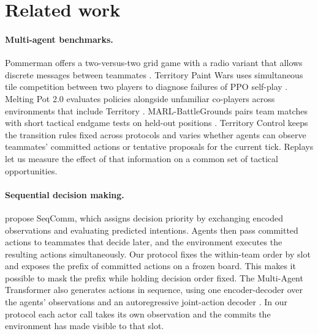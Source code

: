 \section{Related work}
\label{sec:related}

\paragraph{Multi-agent benchmarks.}
Pommerman offers a two-versus-two grid game with a radio variant that allows discrete messages between teammates \citep{resnick2018pommerman}. Territory Paint Wars uses simultaneous tile competition between two players to diagnose failures of PPO self-play \citep{singh2026paintwars}. Melting Pot 2.0 evaluates policies alongside unfamiliar co-players across environments that include Territory \citep{agapiou2022meltingpot}. MARL-BattleGrounds pairs team matches with short tactical endgame tests on held-out positions \citep{hawili2026battlegrounds}. Territory Control keeps the transition rules fixed across protocols and varies whether agents can observe teammates' committed actions or tentative proposals for the current tick. Replays let us measure the effect of that information on a common set of tactical opportunities.

\paragraph{Sequential decision making.}
\citet{ding2024seqcomm} propose SeqComm, which assigns decision priority by exchanging encoded observations and evaluating predicted intentions. Agents then pass committed actions to teammates that decide later, and the environment executes the resulting actions simultaneously. Our protocol fixes the within-team order by slot and exposes the prefix of committed actions on a frozen board. This makes it possible to mask the prefix while holding decision order fixed. The Multi-Agent Transformer also generates actions in sequence, using one encoder-decoder over the agents' observations and an autoregressive joint-action decoder \citep{wen2022mat}. In our protocol each actor call takes its own observation and the commits the environment has made visible to that slot.

